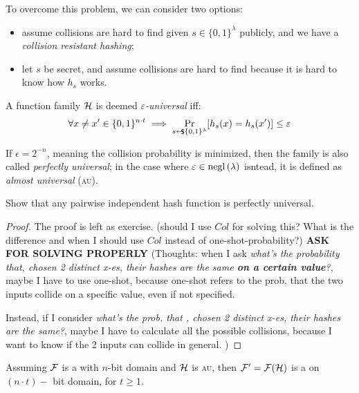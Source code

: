 To overcome this problem, we can consider two options:
\begin{itemize}
    \item assume collisions are hard to find given $s \in \{0,1\}^{\lambda}$ publicly, and we have a \textit{collision resistant hashing};
    \item let $s$ be secret, and assume collisions are hard to find because it is hard to know how $h_{s}$ works.
\end{itemize}

\begin{definition}
    A function family $\mathcal{H}$ is deemed \emph{$\varepsilon$-universal} iff:
    \[
        \forall x \neq x' \in \{0, 1\}^{n\cdot t} \implies \Pr_{s \pickUAR \{0, 1\}^\lambda}[h_s(x) = h_s(x') ] \leq \epsilon  
    \]
\end{definition}

If $\epsilon = 2^{-n}$, meaning the collision probability is minimized, then the family is also called \emph{perfectly universal}; in the case where $\varepsilon \in \mathrm{negl}\left({\lambda}\right)$ isntead, it is defined as \emph{almost universal} (\textsc{au}).

\begin{lemma}
    Show that any pairwise independent hash function is perfectly universal.
\end{lemma}

\begin{proof} The proof is left as exercise.
    (should I use $Col$ for solving this? What is the difference and when I should use $Col$ instead of one-shot-probability?) \textbf{ASK FOR SOLVING PROPERLY} (Thoughts: when I ask \textit{what's the probability that, chosen 2 distinct x-es, their hashes are the same \textbf{on a certain value}?}, maybe I have to use one-shot, because one-shot refers to the prob. that the two inputs collide on a specific value, even if not specified.

    Instead, if I consider \textit{what's the prob. that , chosen 2 distinct x-es, their hashes are the same?}, maybe I have to calculate all the possible collisions, because I want to know if the 2 inputs can collide in general. )
\end{proof}

\begin{theorem}
    Assuming $\mathcal{F}$ is a \prf{} with $n$-bit domain and $\mathcal{H}$ is \textsc{au}, then $\mathcal{F}' = \mathcal{F}(\mathcal{H})$ is a \prf{} on $(n\cdot t)-$ bit domain, for $t \geq 1$.
\end{theorem}


